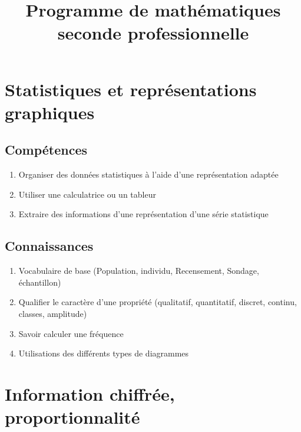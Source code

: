 \documentclass[12pt,a4paper]{article}
\author{}
\date{}
\title{Programme de mathématiques seconde professionnelle}
\begin{document}
\maketitle


\section{Statistiques et représentations graphiques }\label{ch:2:stats_base}

	

\subsection*{Compétences}

\begin{enumerate}
	\item Organiser des données statistiques à l'aide d'une représentation adaptée
	\item Utiliser une calculatrice ou un tableur
	\item Extraire des informations d'une représentation d'une série statistique
\end{enumerate}

\subsection*{Connaissances}

\begin{enumerate}
	\item Vocabulaire de base (Population, individu, Recensement, Sondage, échantillon) 
	\item Qualifier le caractère d'une propriété (qualitatif, quantitatif, discret, continu, classes, amplitude)
	\item Savoir calculer une fréquence
	\item Utilisations des différents types de diagrammes	
\end{enumerate}

\section{Information chiffrée, proportionnalité}
\end{document}
